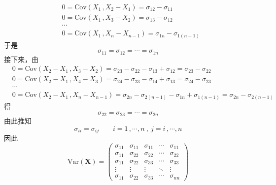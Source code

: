 \documentclass[12pt,hyperref,]{ctexart}
\begin{document}
\begin{equation*}
\begin{aligned}
& 0=\mathrm{Cov}(X_1\, ,X_2-X_1)=\sigma_{12}-\sigma_{11} \\
& 0=\mathrm{Cov}(X_1\, ,X_3-X_2)=\sigma_{13}-\sigma_{12} \\
& \cdots \\
& 0=\mathrm{Cov}(X_1\, ,X_n-X_{n-1})=\sigma_{1n}-\sigma_{1(n-1)} 
\end{aligned}
\end{equation*}于是 \begin{equation*}
\sigma_{11}=\sigma_{12}=\cdots=\sigma_{1n}
\end{equation*}接下来，由 \begin{equation*}
\begin{aligned}
& 0=\mathrm{Cov}(X_2-X_1\, ,X_3-X_2)=\sigma_{23}-\sigma_{22}-\sigma_{13}+\sigma_{12}=\sigma_{23}-\sigma_{22} \\
& 0=\mathrm{Cov}(X_2-X_1\, ,X_4-X_3)=\sigma_{24}-\sigma_{23}-\sigma_{14}+\sigma_{13}=\sigma_{24}-\sigma_{23} \\
& \cdots \\
& 0=\mathrm{Cov}(X_2-X_1\, ,X_n-X_{n-1})=\sigma_{2n}-\sigma_{2(n-1)}-\sigma_{1n}+\sigma_{1(n-1)}=\sigma_{2n}-\sigma_{2(n-1)} 
\end{aligned}
\end{equation*}得 \begin{equation*}
\sigma_{22}=\sigma_{23}=\cdots=\sigma_{2n}
\end{equation*}由此推知 \begin{equation*}
\sigma_{ii}=\sigma_{ij} \qquad i=1\, , \cdots ,n\ ,\ j=i\, ,\cdots ,n
\end{equation*}因此 \begin{equation*}
\mathrm{Var}(\mathbf{X})=
\begin{pmatrix}
\sigma_{11} & \sigma_{11} & \sigma_{11} & \cdots & \sigma_{11} \\
\sigma_{11} & \sigma_{22} & \sigma_{22} & \cdots & \sigma_{22} \\
\sigma_{11} & \sigma_{22} & \sigma_{33} & \cdots & \sigma_{33} \\
\vdots & \vdots & \vdots & \ddots & \vdots \\
\sigma_{11} & \sigma_{22} & \sigma_{33} &  \cdots& \sigma_{nn}
\end{pmatrix}
\end{equation*}

\vspace{3em}
\end{document}
